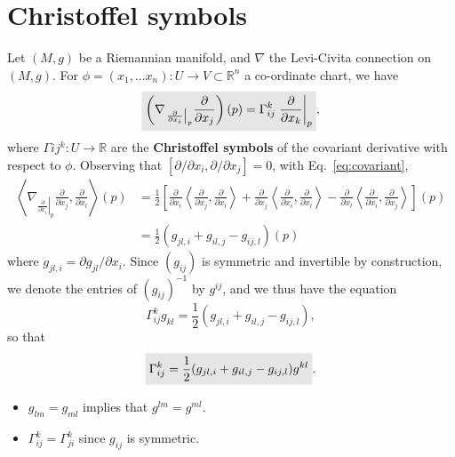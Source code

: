 \documentclass[letter-paper]{tufte-book}
\newenvironment{remark}[1][Remark]{\begin{trivlist}
\item[\hskip \labelsep {\bfseries #1}]}{\end{trivlist}}
\newcommand{\highlight}[1]{\mathchoice%
  {\colorbox{black!10}{$\displaystyle#1$}}%
  {\colorbox{black!10}{$\textstyle#1$}}%
  {\colorbox{black!10}{$\scriptstyle#1$}}%
  {\colorbox{black!10}{$\scriptscriptstyle#1$}}}%
\begin{document}

\section{Christoffel symbols}

Let $(M,g)$ be a Riemannian manifold, and $\nabla$ the Levi-Civita connection on $(M,g)$. For $\phi = (x_1, \ldots x_n): U\to V \subset \mathbb{R}^n$ a co-ordinate chart, we have
\begin{equation}
  \highlight{\left(\nabla_{\left.\frac{\partial}{\partial x_i}\right|_p} \frac{\partial}{\partial x_j}\right)(p) = \Gamma_{ij}^k \left.\frac{\partial}{\partial x_k}\right|_p},
\end{equation}
where $\Gamma{ij}^k : U\to\mathbb{R}$ are the \textbf{Christoffel symbols} of the covariant derivative with respect to $\phi$. Observing that $[\partial / \partial x_i, \partial / \partial x_j] = 0$, with Eq.~\eqref{eq:covariant},
\begin{align*}
  \left\langle \nabla_{\left.\frac{\partial}{\partial x_i}\right|_p} \frac{\partial}{\partial x_j}, \frac{\partial}{\partial x_l} \right\rangle(p)
    &= \frac{1}{2} \left[ \frac{\partial}{\partial x_i}\left\langle \frac{\partial}{\partial x_j}, \frac{\partial}{\partial x_l}\right\rangle + \frac{\partial}{\partial x_j}\left\langle \frac{\partial}{\partial x_i}, \frac{\partial}{\partial x_l}\right\rangle - \frac{\partial}{\partial x_l}\left\langle \frac{\partial}{\partial x_i}, \frac{\partial}{\partial x_j}\right\rangle \right](p)\\
    &= \frac{1}{2}(g_{jl,i} + g_{il,j} - g_{ij,l})(p)
\end{align*}
where $g_{jl,i} = \partial g_{jl} / \partial x_i$. Since $(g_{ij})$ is symmetric and invertible by construction, we denote the entries of $(g_{ij})^{-1}$ by $g^{ij}$, and we thus have the equation
\begin{equation*}
  \Gamma_{ij}^k g_{kl} = \frac{1}{2}(g_{jl,i} + g_{il,j} - g_{ij,l}),
\end{equation*}
so that
\begin{equation}
  \highlight{\Gamma_{ij}^k = \frac{1}{2}(g_{jl,i} + g_{il,j} - g_{ij,l})g^{kl}}.
\end{equation}

\begin{remark}
  \begin{itemize}
    \item $g_{lm} = g_{ml}$ implies that $g^{lm} = g^{ml}$.
    \item $\Gamma_{ij}^k = \Gamma_{ji}^k$ since $g_{ij}$ is symmetric.
  \end{itemize} 
\end{remark}
\end{document}
